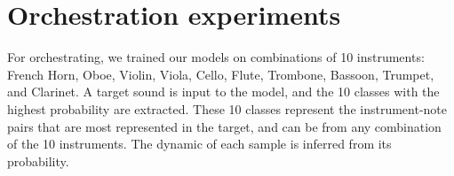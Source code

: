 \documentclass{article}
\begin{document}

\section{Orchestration experiments}

For orchestrating, we trained our models on combinations of 10 instruments: French Horn, Oboe, Violin, Viola, Cello, Flute, Trombone, Bassoon, Trumpet, and Clarinet. A target sound is input to the model, and the 10 classes with the highest probability are extracted. These 10 classes represent the instrument-note pairs that are most represented in the target, and can be from any combination of the 10 instruments. The dynamic of each sample is inferred from its probability.
\end{document}
